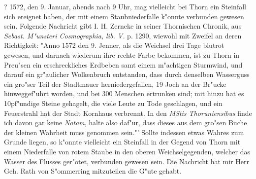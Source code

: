 \documentclass[a4paper, 11pt, oneside, polutonikogreek, german]{article}
\begin{document}
? 1572, den 9. Januar, abends nach 9 Uhr, mag vielleicht bei Thorn ein Steinfall sich ereignet haben, der mit einem Staubniederfalle k"onnte verbunden gewesen sein. Folgende Nachricht gibt I. H. Zerneke in seiner Thornischen Chronik, aus \emph{Sebast. M"unsteri Cosmographia, lib. V.} p. 1290, wiewohl mit Zweifel an deren Richtigkeit: "Anno 1572 den 9. Jenner, als die Weichsel drei Tage blutrot gewesen, und darnach wiederum ihre rechte Farbe bekommen, ist zu Thorn in Preu"sen ein erschreckliches Erdbeben samt einem m"achtigen Sturmwind, und darauf ein gr"aulicher Wolkenbruch entstanden, dass durch denselben Wasserguss ein gro"ser Teil der Stadtmauer herniedergefallen, 19 Joch an der Br"ucke hinweggef"uhrt worden, und bei 300 Menschen ertrunken sind; mit hinzu hat es 10pf"undige Steine gehagelt, die viele Leute zu Tode geschlagen, und ein Feuerstrahl hat der Stadt Kornhaus verbrennt. In den \emph{MStis Thoruniensibus} finde ich davon gar keine \emph{Notam}, halte also daf"ur, dass dieses aus dem gro"sen Buche der kleinen Wahrheit muss genommen sein."' Sollte indessen etwas Wahres zum Grunde liegen, so k"onnte vielleicht ein Steinfall in der Gegend von Thorn mit einem Niederfalle von rotem Staube in den oberen Weichselgegenden, welcher das Wasser des Flusses ger"otet, verbunden gewesen sein. Die Nachricht hat mir Herr Geh. Rath von S"ommerring mitzuteilen die G"ute gehabt.
\end{document}
